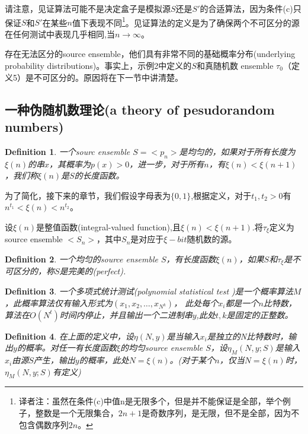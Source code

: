 \documentclass[]{article}
\newtheorem{definition}{Definition}
\begin{document}
请注意，见证算法可能不是决定盒子是模拟源$S$还是$S'$的合适算法，因为条件(c)只保证$S$和$S'$在某些$n$值下表现不同\footnote{译者注：虽然在条件(c)中值n是无限多个，但是并不能保证是全部，举个例子，整数是一个无限集合，$2n+1$是奇数序列，是无限，但不是全部，因为不包含偶数序列$2n$。}。见证算法的定义是为了确保两个不可区分的源在任何测试中表现几乎相同,当$n \rightarrow\infty$。


存在无法区分的source ensemble，他们具有非常不同的基础概率分布(underlying probability distributions)。事实上，示例2中定义的$S$和真随机数 ensemble $\tau_0$（定义5）是不可区分的。原因将在下一节中讲清楚。


\subsection{一种伪随机数理论(a theory of pesudorandom numbers)}

\begin{definition}
	一个sourc ensemble $S=<p_n>$是均匀的，如果对于所有长度为$\xi(n)$的串$x$，其概率为$p(x)>0$，进一步，对于所有$n$，有$\xi(n)<\xi(n+1)$，我们称$\xi(n)$是$S$的长度函数。
\end{definition}

为了简化，接下来的章节，我们假设字母表为$\{0,1\}$,根据定义，对于$t_1,t_2>0$有$n^{t_1}<\xi(n)<n^{t_2}$。


设$\xi(n)$是整值函数(integral-valued function),且$\xi(n)<\xi(n+1)$.将$\tau_\xi$定义为source ensemble $<S_n>$，其中$S_n$是对应于$\xi-bit$随机数的源。


\begin{definition}
	一个均匀的source ensemble $S$，有长度函数$\xi(n)$，如果$S$和$\tau_\xi$是不可区分的，称$S$是完美的(perfect).
\end{definition}



\begin{definition}
	一个多项式统计测试(polynomial statistical test )是一个概率算法$M$，此概率算法仅有输入形式为$(x_1,x_2,\ldots,x_{N^k})$，
	此处每个$x_i$都是一个$n$比特数，算法在$O(N^t)$时间内停止，并且输出一个二进制串$y$,此处$t,k$是固定的正整数。
\end{definition}


\begin{definition}
	在上面的定义中，设$\eta(N,y)$是当输入$x_i$是独立的N比特数时，输出$y$的概率。对任一有长度函数$\xi$的均匀source ensemble $S$，设$\eta_M(N,y;S)$是输入$x_i$由源$S$产生，输出$y$的概率，此处$N=\xi(n)$。(对于某个$n$，仅当$N=\xi(n)$时，$\eta_M(N,y;S)$有定义)
\end{definition}
\end{document}

